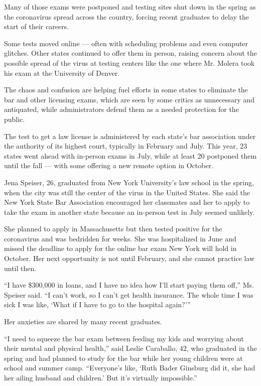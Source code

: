 Many of those exams were postponed and testing sites shut down in the
spring as the coronavirus spread across the country, forcing recent
graduates to delay the start of their careers.

Some tests moved online --- often with scheduling problems and even
computer glitches. Other states continued to offer them in person,
raising concern about the possible spread of the virus at testing
centers like the one where Mr. Molera took his exam at the University of
Denver.

The chaos and confusion are helping fuel efforts in some states to
eliminate the bar and other licensing exams, which are seen by some
critics as unnecessary and antiquated, while administrators defend them
as a needed protection for the public.

The test to get a law license is administered by each state's bar
association under the authority of its highest court, typically in
February and July. This year, 23 states went ahead with in-person exams
in July, while at least 20 postponed them until the fall --- with some
offering a new remote option in October.

Jena Speiser, 26, graduated from New York University's law school in the
spring, when the city was still the center of the virus in the United
States. She said the New York State Bar Association encouraged her
classmates and her to apply to take the exam in another state because an
in-person test in July seemed unlikely.

She planned to apply in Massachusetts but then tested positive for the
coronavirus and was bedridden for weeks. She was hospitalized in June
and missed the deadline to apply for the online bar exam New York will
hold in October. Her next opportunity is not until February, and she
cannot practice law until then.

``I have \$300,000 in loans, and I have no idea how I'll start paying
them off,'' Ms. Speiser said. ``I can't work, so I can't get health
insurance. The whole time I was sick I was like, `What if I have to go
to the hospital again?'''

Her anxieties are shared by many recent graduates.

``I need to squeeze the bar exam between feeding my kids and worrying
about their mental and physical health,'' said Leslie Caraballo, 42, who
graduated in the spring and had planned to study for the bar while her
young children were at school and summer camp. ``Everyone's like, `Ruth
Bader Ginsburg did it, she had her ailing husband and children.' But
it's virtually impossible.''

